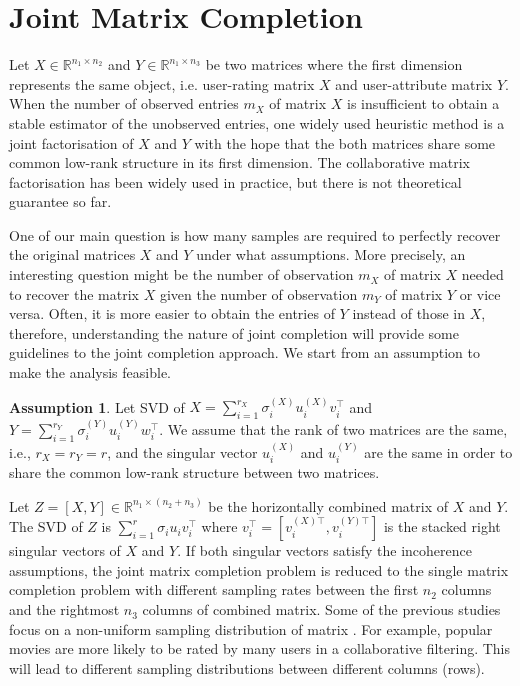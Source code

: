 \documentclass{article} %
\theoremstyle{definition}
\newtheorem{assumption}{Assumption}
\begin{document}
\section{Joint Matrix Completion}
Let $X \in \mathbb{R}^{n_1 \times n_2}$ and $Y \in \mathbb{R}^{n_1 \times n_3}$ be two matrices where the first dimension represents the same object, i.e. user-rating matrix $X$ and user-attribute matrix $Y$. When the number of observed entries $m_X$ of matrix $X$ is insufficient to obtain a stable estimator of the unobserved entries, one widely used heuristic method is a joint factorisation of $X$ and $Y$ with the hope that the both matrices share some common low-rank structure in its first dimension. The collaborative matrix factorisation has been widely used in practice, but there is not theoretical guarantee so far.

One of our main question is how many samples are required to perfectly recover the original matrices $X$ and $Y$ under what assumptions. More precisely, an interesting question might be the number of observation $m_X$ of matrix $X$ needed to recover the matrix $X$ given the number of observation $m_Y$ of matrix $Y$ or vice versa. Often, it is more easier to obtain the entries of $Y$ instead of those in $X$, therefore, understanding the nature of joint completion will provide some guidelines to the joint completion approach. We start from an assumption to make the analysis feasible.

\begin{assumption}\label{assume:share}
Let SVD of $X = \sum_{i=1}^{r_X} \sigma_i^{(X)} u_i^{(X)} v_i^\top$ and $Y = \sum_{i=1}^{r_Y} \sigma_i^{(Y)} u_i^{(Y)} w_i^\top$. We assume that the rank of two matrices are the same, i.e., $r_X = r_Y = r$, and the singular vector $u_i^{(X)}$ and $u_i^{(Y)}$ are the same in order to share the common low-rank structure between two matrices.
\end{assumption}

Let $Z = [X, Y] \in \mathbb{R}^{n_1 \times (n_2+n_3)}$ be the horizontally combined matrix of $X$ and $Y$. The SVD of $Z$ is $\sum_{i=1}^{r}\sigma_i u_i v_i^\top$ where $v_i^\top = [v_i^{(X)\top}, v_i^{(Y)\top}]$ is the stacked right singular vectors of $X$ and $Y$. If both singular vectors satisfy the incoherence assumptions, the joint matrix completion problem is reduced to the single matrix completion problem with different sampling rates between the first $n_2$ columns and the rightmost $n_3$ columns of combined matrix. Some of the previous studies focus on a non-uniform sampling distribution of matrix \cite{foygel2011learning,lounici2011optimal,negahban2012restricted,klopp2014noisy}. For example, popular movies are more likely to be rated by many users in a collaborative filtering. This will lead to different sampling distributions between different columns (rows). 
\end{document}
